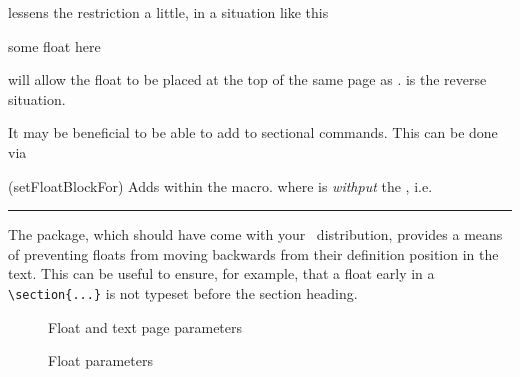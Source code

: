 \cmd{\FloatBlockAllowAbove} lessens the restriction a little, in a
situation like this
\begin{lcode}
  \FloatBlock
  some float here
\end{lcode}
\cmd{\FloatBlockAllowAbove} will allow the float to be placed at the
top of the same page as \cmd{\FloatBlock}. \cmd{\FloatBlockAllowBelow}
is the reverse situation.

It may be beneficial to be able to add \cmd{\FloatBlock} to sectional
commands. This can be done via
\begin{syntax}
  \cmd{\setFloatBlockFor}
\end{syntax}
\glossary(setFloatBlockFor)%
{}%
{Adds  within the  macro.}
where  is \emph{withput} the \cs{}, i.e.\
\begin{lcode}
\end{lcode}



 
\fancybreak{}

    The  package, which should have come with your \ltx\
distribution, provides a means of preventing floats from moving
backwards from their definition position in the text. This can be useful to
ensure, for example, that a float early in a \verb?\section{...}? is not 
typeset before the section heading\index{heading}.

\begin{figure}
\centering
\drawparameterstrue
\drawfloatpage
\caption{Float and text page parameters}\label{fig:fpp}
\end{figure}

\begin{figure}
\centering
\drawparameterstrue
{}
\drawfloat
\caption{Float parameters}\label{fig:flp}
\end{figure}

